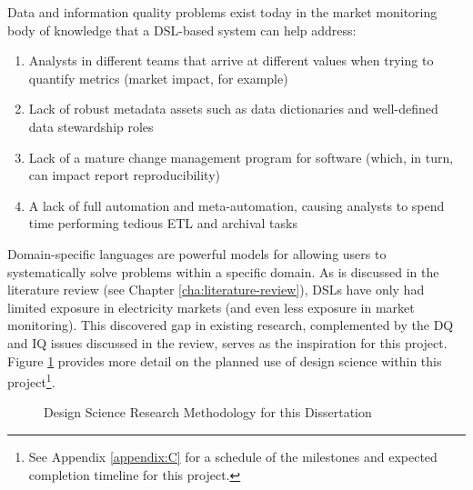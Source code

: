 Data and information quality problems exist today in the market monitoring body of knowledge that a DSL-based system can help address: 

\begin{enumerate}
    \item {Analysts in different teams that arrive at different values when trying to quantify metrics (market impact, for example)}
    \item {Lack of robust metadata assets such as data dictionaries and well-defined data stewardship roles}
    \item {Lack of a mature change management program for software (which, in turn, can impact report reproducibility) }
    \item {A lack of full automation and meta-automation, causing analysts to spend time performing tedious ETL and archival tasks}
\end{enumerate}

Domain-specific languages are powerful models for allowing users to systematically solve problems within a specific domain. As is discussed in the literature review (see Chapter \ref{cha:literature-review}), DSLs have only had limited exposure in electricity markets (and even less exposure in market monitoring). This discovered gap in existing research, complemented by the DQ and IQ issues discussed in the review, serves as the inspiration for this project. Figure \ref{fig:dsrm} provides more detail on the planned use of design science within this project\footnote{See Appendix \ref{appendix:C} for a schedule of the milestones and expected completion timeline for this project.}.

\begin{figure}[h]
\centering
{}
\caption{Design Science Research Methodology for this Dissertation}
\label{fig:dsrm}
\end{figure}

